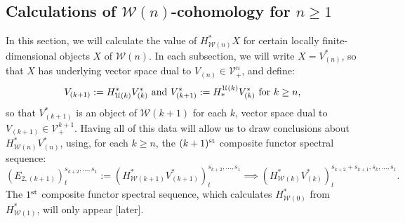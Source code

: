 \documentclass[11pt]{amsart}
\theoremstyle{plain}
\theoremstyle{definition}
\newcommand{\calU}{\mathcal{U}}
\newcommand{\calV}{\mathcal{V}}
\newcommand{\calw}{\mathcal{W}}
\theoremstyle{plain}
\newcommand{\vect}[2]{\calV^{#1}_{#2}}
\begin{document}
\begin{Calculations of HWn for n nonzero}
\section{\textbf{Calculations of ${\calw(n)}$-cohomology for $n\geq 1$}}
In this section, we will calculate the value of $H^*_{\calw(n)}X$ for certain locally finite-dimensional objects $X$ of $\calw(n)$. In each subsection, we will write $X=V^*_{(n)}$, so that $X$ has underlying vector space dual to $V_{{(n)}}\in\vect{n}{+}$, and define:
\[V_{(k+1)}:=H^*_{\calU(k)}V^*_{(k)}\textup{ and }V^*_{(k+1)}:=H_*^{\calU(k)}V^*_{(k)}\textup{ for $k\geq n$},\]
so that $V^*_{(k+1)}$ is an object of $\calw(k+1)$ for each $k$, vector space dual to $V_{(k+1)}\in\vect{k+1}{+}$.
Having all of this data will allow us to draw conclusions about $H^*_{\calw(n)}V^*_{(n)}$, using, for each $k\geq n$, the $(k+1)^{\textup{st}}$ composite functor spectral sequence:
\[(E_{2,(k+1)})^{s_{k+2},\ldots,s_1}_{t}:=(H^*_{\calw(k+1)}V^*_{(k+1)})^{s_{k+2},\ldots,s_1}_{t}\implies (H^*_{\calw(k)}V^*_{(k)})^{s_{k+2}+s_{k+1},s_k,\ldots,s_1}_{t}.\]
The $1^{\textup{st}}$ composite functor spectral sequence, which calculates $H^*_{\calw(0)}$ from $H^*_{\calw(1)}$, will only appear [later].




\end{Calculations of HWn for n nonzero}
\end{document}

